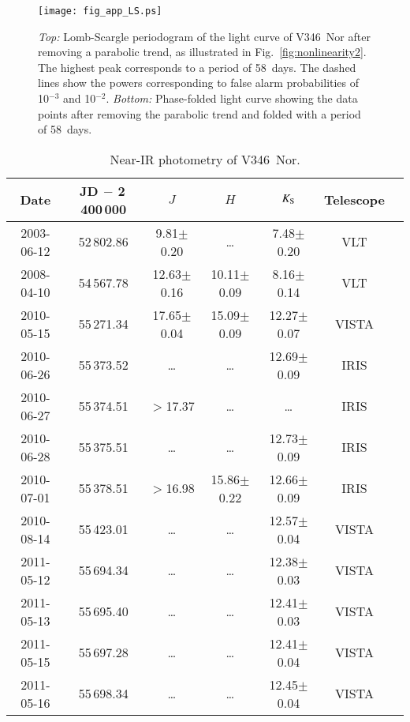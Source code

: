 \documentclass{aa}
\begin{document}
\begin{appendix}
\begin{figure}
\centering
\texttt{[image: fig\_app\_LS.ps]}
\caption{{\it Top:} Lomb-Scargle periodogram of the light curve of
  V346~Nor after removing a parabolic trend, as illustrated in
  Fig.~\ref{fig:nonlinearity2}. The highest peak corresponds to a
  period of 58~days. The dashed lines show the powers corresponding to
  false alarm probabilities of 10$^{-3}$ and 10$^{-2}$. {\it Bottom:}
  Phase-folded light curve showing the data points after removing the
  parabolic trend and folded with a period of 58~days.}
\label{fig:periodogram}
\end{figure}


\begin{table*}
\caption{Near-IR photometry of V346~Nor.}\label{tab:phot}
\begin{tabular}{ccccccc}
\hline \hline
Date       & JD$\,{-}\,$2\,400\,000 & $J$            & $H$              & $K_{\rm S}$      & Telescope \\
\hline
2003-06-12 & 52\,802.86           & 9.81$\pm$0.20    & \dots            & 7.48$\pm$0.20    & VLT   \\
2008-04-10 & 54\,567.78           & 12.63$\pm$0.16   & 10.11$\pm$0.09   & 8.16$\pm$0.14    & VLT   \\
2010-05-15 & 55\,271.34           & 17.65$\pm$0.04   & 15.09$\pm$0.09	& 12.27$\pm$0.07   & VISTA \\
2010-06-26 & 55\,373.52           & \dots	     & \dots	        & 12.69$\pm$0.09   & IRIS  \\
2010-06-27 & 55\,374.51           & $>$17.37	     & \dots		& \dots 	   & IRIS  \\
2010-06-28 & 55\,375.51           & \dots	     & \dots	        & 12.73$\pm$0.09   & IRIS  \\
2010-07-01 & 55\,378.51           & $>$16.98	     & 15.86$\pm$0.22	& 12.66$\pm$0.09   & IRIS  \\
2010-08-14 & 55\,423.01           & \dots	     & \dots		& 12.57$\pm$0.04   & VISTA \\
2011-05-12 & 55\,694.34           & \dots	     & \dots		& 12.38$\pm$0.03   & VISTA \\
2011-05-13 & 55\,695.40           & \dots	     & \dots		& 12.41$\pm$0.03   & VISTA \\
2011-05-15 & 55\,697.28           & \dots	     & \dots		& 12.41$\pm$0.04   & VISTA \\
2011-05-16 & 55\,698.34		  & \dots            & \dots            & 12.45$\pm$0.04   & VISTA \\

\end{tabular}
\end{table*}
\end{appendix}
\end{document}
